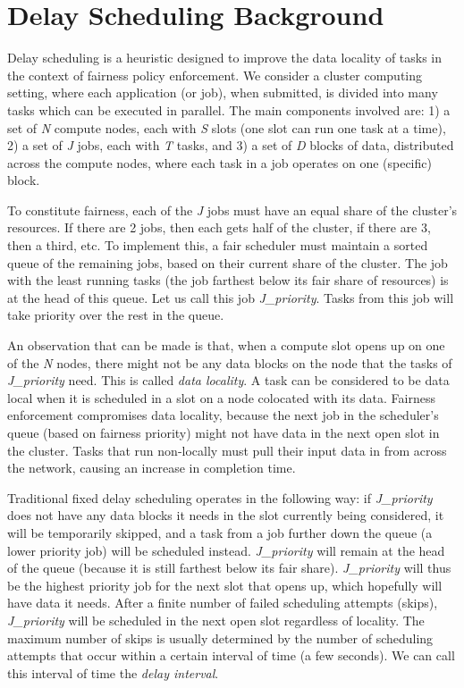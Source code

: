 \section{Delay Scheduling Background}\label{sec:background}

Delay scheduling is a heuristic designed to improve the data locality of tasks in the
context of fairness policy enforcement. We consider a cluster computing setting, where each 
application (or job), when submitted, is divided into many tasks which can be executed in 
parallel. The main components involved are: 1) a set of \textit{N} compute nodes, each with 
\textit{S} slots (one slot can run one task at a time), 2) a set of \textit{J} jobs, each 
with \textit{T} tasks, and 3) a set of \textit{D} blocks of data, distributed across the 
compute nodes, where each task in a job operates on one (specific) block.

To constitute fairness, each of the \textit{J} jobs must have an equal share of the 
cluster's resources. If there are 2 jobs, then each gets half of the cluster, if there 
are 3, then a third, etc. To implement this, a fair scheduler must maintain a sorted 
queue of the remaining jobs, based on their current share of the cluster. The job with 
the least running tasks (the job farthest below its fair share of resources) is at the 
head of this queue. Let us call this job \textit{J\_priority}. Tasks from this job will 
take priority over the rest in the queue.
   
An observation that can be made is that, when a compute slot opens up on one of the 
\textit{N} nodes, there might not be any data blocks on the node that the tasks of 
\textit{J\_priority} need. This is called \textit{data locality}. A task can 
be considered to be data local when it is scheduled in a slot on a node colocated with its
data. Fairness enforcement compromises data locality, because the next job in the 
scheduler's queue (based on fairness priority) might not have data in the next open slot 
in the cluster. Tasks that run non-locally must pull their input data in from across the 
network, causing an increase in completion time.

Traditional fixed delay scheduling operates in the following way: if 
\textit{J\_priority} does not have any data blocks it needs in the slot currently being 
considered, it will be temporarily skipped, and a task from a job further down the queue 
(a lower priority job) will be scheduled instead. \textit{J\_priority} will remain at the 
head of the queue (because it is still farthest below its fair share). 
\textit{J\_priority} will thus be the highest priority job for the next slot that opens 
up, which hopefully will have data it needs. After a finite number of failed scheduling 
attempts (skips), \textit{J\_priority} will be scheduled in the next open slot regardless 
of locality. The maximum number of skips is usually determined by the number of scheduling
attempts that occur within a certain interval of time (a few seconds). We can call this
interval of time the \textit{delay interval}.

